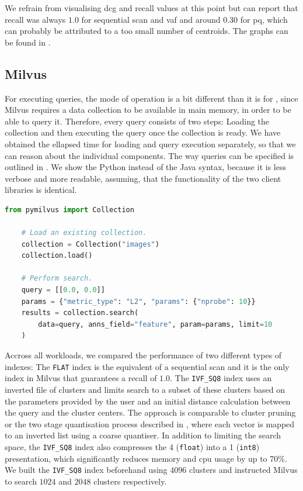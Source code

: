 We refrain from visualising \acrshort{dcg} and recall values at this point but can report that recall was always $1.0$ for sequential scan and \acrshort{vaf} and around $0.30$ for \acrshort{pq}, which can probably be attributed to a too small number of centroids. The graphs can be found in .

\subsection{Milvus}
For executing queries, the mode of operation is a bit different than it is for \cottontail, since Milvus requires a data collection to be available in main memory, in order to be able to query it. Therefore, every query consists of two steps: Loading the collection and then executing the query once the collection is ready. We have obtained the ellapsed time for loading and query execution separately, so that we can reason about the individual components. The way queries can be specified is outlined in . We show the Python instead of the Java syntax, because it is less verbose and more readable, assuming, that the functionality of the two client libraries is identical.  

\begin{lstlisting}[language=Python, caption={Example of a similarity search query to Milvus in Python on a 2-dimensional vector with the prior loading of a data collection ``images''.}, label=listing:milvus_query, numbers=none]
    from pymilvus import Collection
    
    # Load an existing collection.
    collection = Collection("images")      
    collection.load()

    # Perform search.
    query = [[0.0, 0.0]]
    params = {"metric_type": "L2", "params": {"nprobe": 10}}
    results = collection.search(
        data=query, anns_field="feature", param=params, limit=10
    )
\end{lstlisting}

Accross all workloads, we compared the performance of two different types of indexes: The \texttt{FLAT} index is the equivalent of a sequential scan and it is the only index in Milvus that guarantees a recall of $1.0$. The \texttt{IVF\_SQ8} index uses an inverted file of clusters and limits search to a subset of these clusters based on the parameters provided by the user and an initial distance calculation between the query and the cluster centers. The approach is comparable to cluster pruning \cite{Chierichetti:2007Finding} or the two stage quantisation process described in \cite{Jegou:2010Product}, where each vector is mapped to an inverted list using a coarse quantiser. In addition to limiting the search space, the \texttt{IVF\_SQ8} index also compresses the \SI{4}{\byte} (\texttt{float}) into a \SI{1}{\byte} (\texttt{int8}) presentation, which significantly reduces memory and \acrshort{cpu} usage by up to 70\%. We built the \texttt{IVF\_SQ8} index beforehand using $4096$ clusters and instructed Milvus to search $1024$ and $2048$ clusters respectively.

